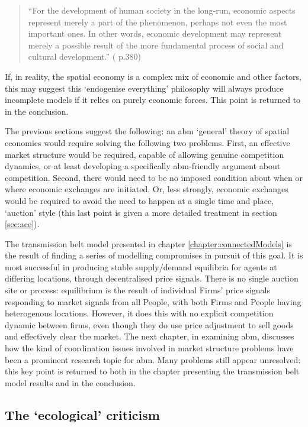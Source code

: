 \begin{quote}
``For the development of human society in the long-run, economic aspects represent merely a part of the phenomenon, perhaps not even the most important ones. In other words, economic development may represent merely a possible result of the more fundamental process of social and cultural development.'' (\citealt{fujita_location_1999} p.380)
\end{quote}

If, in reality, the spatial economy is a complex mix of economic and other factors, this may suggest this `endogenise everything' philosophy will always produce incomplete models if it relies on purely economic forces. This point is returned to in the conclusion. 

The previous sections suggest the following: an \gls{abm} `general' theory of spatial economics would require solving the following two problems. First, an effective market structure would be required, capable of allowing genuine competition dynamics, or at least developing a specifically \gls{abm}-friendly argument about competition. Second, there would need to be no imposed condition about when or where economic exchanges are initiated. Or, less strongly, economic exchanges would be required to avoid the need to happen at a single time and place, `auction' style (this last point is given a more detailed treatment in section \ref{sec:ace}).

The transmission belt model presented in chapter \ref{chapter:connectedModels} is the result of finding a series of modelling compromises in pursuit of this goal. It is most successful in producing  stable supply/demand equilibria for agents at differing locations, through decentralised price signals. There is no single auction site or process: equilibrium is the result of individual Firms' price signals responding to market signals from all People, with both Firms and People having heterogenous locations. However, it does this with no explicit competition dynamic between firms, even though they do use price adjustment to sell goods and effectively clear the market. The next chapter, in examining \gls{abm}, discusses how the kind of coordination issues involved in market structure problems have been a prominent research topic for \gls{abm}. Many problems still appear unresolved: this key point is returned to both in the chapter presenting the transmission belt model results and in the conclusion. 

\subsection{The `ecological' criticism \label{sec:ecocrit}}


